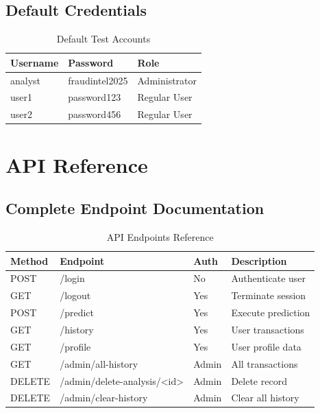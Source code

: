 \documentclass[12pt,a4paper,twoside]{report}
\begin{document}
\subsection{Default Credentials}

\begin{table}[H]
    \centering
    \begin{tabular}{|l|l|l|}
        \hline
        \textbf{Username} & \textbf{Password} & \textbf{Role} \\
        \hline
        analyst & fraudintel2025 & Administrator \\
        \hline
        user1 & password123 & Regular User \\
        \hline
        user2 & password456 & Regular User \\
        \hline
    \end{tabular}
    \caption{Default Test Accounts}
\end{table}

\section{API Reference}

\subsection{Complete Endpoint Documentation}

\begin{table}[H]
    \centering
    \begin{tabular}{|l|l|l|p{5cm}|}
        \hline
        \textbf{Method} & \textbf{Endpoint} & \textbf{Auth} & \textbf{Description} \\
        \hline
        POST & /login & No & Authenticate user \\
        \hline
        GET & /logout & Yes & Terminate session \\
        \hline
        POST & /predict & Yes & Execute prediction \\
        \hline
        GET & /history & Yes & User transactions \\
        \hline
        GET & /profile & Yes & User profile data \\
        \hline
        GET & /admin/all-history & Admin & All transactions \\
        \hline
        DELETE & /admin/delete-analysis/<id> & Admin & Delete record \\
        \hline
        DELETE & /admin/clear-history & Admin & Clear all history \\
        \hline
    \end{tabular}
    \caption{API Endpoints Reference}
\end{table}
\end{document}
